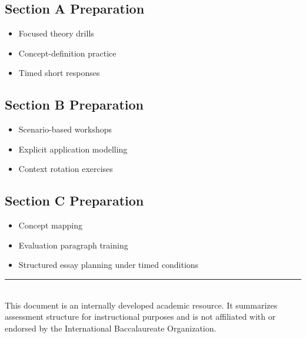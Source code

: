 \documentclass[12pt,a4paper]{article}
\begin{document}
\subsection*{Section A Preparation}
\begin{itemize}
    \item Focused theory drills
    \item Concept-definition practice
    \item Timed short responses
\end{itemize}

\subsection*{Section B Preparation}
\begin{itemize}
    \item Scenario-based workshops
    \item Explicit application modelling
    \item Context rotation exercises
\end{itemize}

\subsection*{Section C Preparation}
\begin{itemize}
    \item Concept mapping
    \item Evaluation paragraph training
    \item Structured essay planning under timed conditions
\end{itemize}

\vfill

\begin{center}
\rule{\textwidth}{0.4pt} \\
\small{This document is an internally developed academic resource. 
It summarizes assessment structure for instructional purposes and is not affiliated with or endorsed by the International Baccalaureate Organization.}
\end{center}
\end{document}
